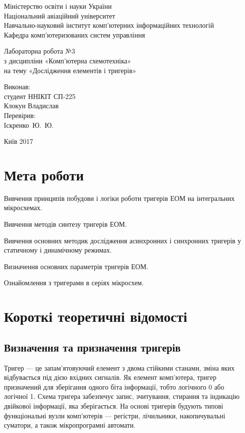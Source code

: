 \documentclass[a4paper,oneside,DIV=10,12pt]{scrartcl}
\begin{document}
	\begin{titlepage}
	\begin{center}
		Міністерство освіти і науки України\\
		Національний авіаційний університет\\
		Навчально-науковий інститут комп'ютерних інформаційних технологій\\
		Кафедра комп'ютеризованих систем управління

		\vspace{\fill}
		Лабораторна робота №3\\
		з дисципліни «Комп'ютерна схемотехніка»\\
		на тему «Дослідження елементів і тригерів»\\
		
		\vspace{\fill}
		\begin{flushright}
		Виконав:\\
		студент ННІКІТ СП-225\\
		Клокун Владислав\\
		Перевірив:\\
		Іскренко~Ю.~Ю.
		\end{flushright}
		
		Київ 2017
	\end{center}
	\end{titlepage}
	
	\section{Мета роботи}
		\begin{steps}
			\item Вивчення принципів побудови і логіки роботи тригерів ЕОМ на інтегральних мікросхемах.
			\item Вивчення методів синтезу тригерів ЕОМ.
			\item Вивчення основних методик дослідження асинхронних і синхронних тригерів у статичному і динамічному режимах.
			\item Визначення основних параметрів тригерів ЕОМ.
			\item Ознайомлення з тригерами в серіях мікросхем.
		\end{steps}
	
	\section{Короткі теоретичні відомості}
		\subsection{Визначення та призначення тригерів}
			Тригер — це запам'ятовуючий елемент з двома стійкими станами, зміна яких відбувається під дією вхідних сигналів. Як елемент комп'ютера, тригер призначений для зберігання одного біта інформації, тобто логічного 0 або логічної 1. Схема тригера забезпечує запис, зчитування, стирання та індикацію двійкової інформації, яка зберігається. На основі тригерів будують типові функціональні вузли комп'ютерів — регістри, лічильники, накопичувальні суматори, а також мікропрограмні автомати.
			
\end{document}
